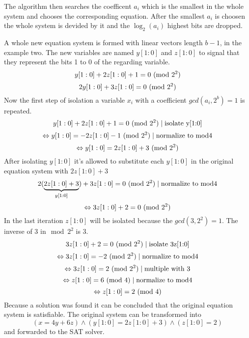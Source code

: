 The algorithm then searches the coefficent $a_i$ which is the smallest in the whole system and chooses the corresponding equation.
After the smallest $a_i$ is choosen the whole system is devided by it and the $\log_{2}(a_i)$ highest bits are dropped.

A whole new equation system is formed with linear vectors length $b-1$, in the example two.
The new variables are named $y[1:0]$ and $z[1:0]$ to signal that they represent the bits 1 to 0 of the regarding variable.
$$y[1 : 0] + 2z[1 : 0] + 1 = 0 \ (\mathrm{mod}\ 2^2)$$
$$2y[1 : 0] + 3z[1 : 0] = 0\ (\mathrm{mod}\ 2^2)$$
Now the first step of isolation a variable $x_i$ with a coefficient $gcd(a_i, 2^b)=1$ is repeated.
$$y[1 : 0] + 2z[1 : 0] + 1 = 0 \ (\mathrm{mod}\ 2^2)\mid \text{isolate y[1:0]}$$
$$\Leftrightarrow y[1 : 0] = -2z[1 : 0] -1 \ (\mathrm{mod}\ 2^2) \mid \text{normalize to mod4}$$
$$\Leftrightarrow y[1 : 0] = 2z[1 : 0] +3 \ (\mathrm{mod}\ 2^2)$$
After isolating $y[1 : 0] $ it's allowed to substitute each $y[1 : 0] $ in the original equation system with $2z[1:0]+3$
$$2(\underbrace{2z[1:0]+3}_{y[1:0]}) + 3z[1 : 0] = 0\ (\mathrm{mod}\ 2^2) \mid \text{normalize to mod4}$$
$$\Leftrightarrow 3z[1:0] + 2 = 0 \ (\mathrm{mod}\ 2^2)$$
In the last iteration $z[1:0]$ will be isolated because the $gcd(3,2^2) = 1$. The inverse of 3 in$\mod{2^2}$ is 3.
$$3z[1:0] + 2 = 0 \ (\mathrm{mod}\ 2^2) \mid \text{isolate 3z[1:0]}$$
$$\Leftrightarrow 3z[1:0]=-2  \ (\mathrm{mod}\ 2^2)   \mid \text{normalize to mod4}$$
$$\Leftrightarrow 3z[1:0]=2  \ (\mathrm{mod}\ 2^2)   \mid \text{multiple with 3}$$
$$\Leftrightarrow z[1:0]=6  \ (\mathrm{mod}\ 4)  \mid \text{normalize to mod4}$$
$$\Leftrightarrow z[1:0]=2  \ (\mathrm{mod}\ 4)$$
Because a solution was found it can be concluded that the original equation system is satisfiable.
The original system can be transformed into $$(x = 4y + 6z) \land (y[1 : 0] = 2z[1 : 0] + 3) \land (z[1 : 0] = 2)$$ and forwarded to the SAT solver.
